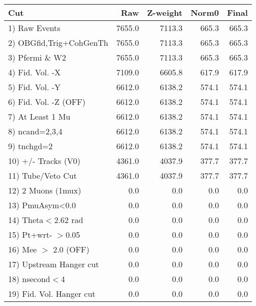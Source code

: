  \begin{table}[h!]\centering
 \begin{tabular}{||l||r|r|r|r||}
 \hline
 \hline
 Cut & Raw & Z-weight & Norm0 & Final \\
 \hline
  1) Raw Events           &      7655.0 &      7113.3 &       665.3 &       665.3 \\
  2) OBGfid,Trig+CohGenTh &      7655.0 &      7113.3 &       665.3 &       665.3 \\
  3) Pfermi \& W2         &      7655.0 &      7113.3 &       665.3 &       665.3 \\
  4) Fid. Vol. -X         &      7109.0 &      6605.8 &       617.9 &       617.9 \\
  5) Fid. Vol. -Y         &      6612.0 &      6138.2 &       574.1 &       574.1 \\
  6) Fid. Vol. -Z (OFF)   &      6612.0 &      6138.2 &       574.1 &       574.1 \\
  7) At Least 1 Mu        &      6612.0 &      6138.2 &       574.1 &       574.1 \\
  8) ncand=2,3,4          &      6612.0 &      6138.2 &       574.1 &       574.1 \\
  9) tnchgd=2             &      6612.0 &      6138.2 &       574.1 &       574.1 \\
 10) +/- Tracks (V0)      &      4361.0 &      4037.9 &       377.7 &       377.7 \\
 11) Tube/Veto Cut        &      4361.0 &      4037.9 &       377.7 &       377.7 \\
 12) 2 Muons (1mux)       &         0.0 &         0.0 &         0.0 &         0.0 \\
 13) PmuAsym<0.0          &         0.0 &         0.0 &         0.0 &         0.0 \\
 14) Theta$<$2.62 rad     &         0.0 &         0.0 &         0.0 &         0.0 \\
 15) Pt+wrt- $>$0.05      &         0.0 &         0.0 &         0.0 &         0.0 \\
 16) Mee $>$ 2.0  (OFF)   &         0.0 &         0.0 &         0.0 &         0.0 \\
 17) Upstream Hanger cut  &         0.0 &         0.0 &         0.0 &         0.0 \\
 18) nsecond$<$4          &         0.0 &         0.0 &         0.0 &         0.0 \\
 19) Fid. Vol. Hanger cut &         0.0 &         0.0 &         0.0 &         0.0 \\

\end{tabular}
\end{table}
